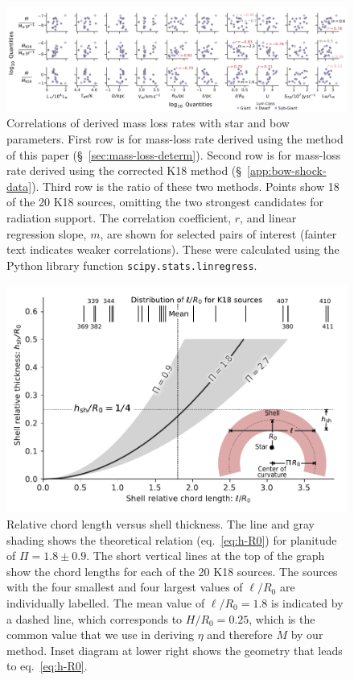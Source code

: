 \begin{figure}
  \centering
  \includegraphics[width=\linewidth]{figs/mdot_correlations_edited}
  \caption{Correlations of derived mass loss rates with star and bow
    parameters. First row is for mass-loss rate derived using the
    method of this paper (\S~\ref{sec:mass-loss-determ}).  Second row
    is for mass-loss rate derived using the corrected K18 method
    (\S~\ref{app:bow-shock-data}).  Third row is the ratio of these
    two methods.  Points show 18 of the 20 K18 sources, omitting the
    two strongest candidates for radiation support.  The correlation
    coefficient, \(r\), and linear regression slope, \(m\), are shown
    for selected pairs of interest (fainter text indicates weaker
    correlations).  These were calculated using the Python library
    function \texttt{scipy.stats.linregress}.}
  \label{fig:correlations}
\end{figure}

\begin{figure}
  \centering
  \includegraphics[width=\linewidth]{figs/H_versus_ell_annotated}
  \caption{Relative chord length versus shell thickness.  The line and
    gray shading shows the theoretical relation (eq.~\eqref{eq:h-R0})
    for planitude of \(\Pi = 1.8 \pm 0.9\).  The short vertical lines
    at the top of the graph show the chord lengths for each of the 20
    K18 sources.  The sources with the four smallest and four largest
    values of \(\ell/R_0\) are individually labelled. The mean value
    of \(\ell / R_0 = 1.8\) is indicated by a dashed line, which
    corresponds to \(H/R_0 = 0.25\), which is the common value that we
    use in deriving \(\eta\) and therefore \(\dot{M}\) by our method.
    Inset diagram at lower right shows the geometry that leads to
    eq.~\eqref{eq:h-R0}.  }
  \label{fig:H-versus-ell}
\end{figure}


